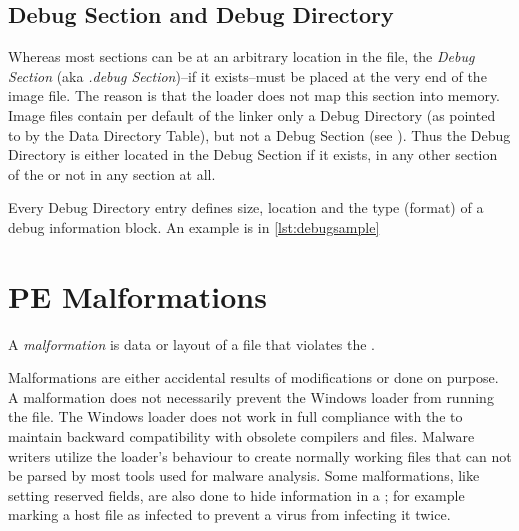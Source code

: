 \subsection*{Debug Section and Debug Directory}

Whereas most sections can be at an arbitrary location in the file, the \emph{Debug Section} (aka \emph{.debug Section})--if it exists--must be placed at the very end of the image file. The reason is that the loader does not map this section into memory. Image files contain per default of the linker only a Debug Directory (as pointed to by the Data Directory Table), but not a Debug Section (see \cite[]{pespec}). Thus the Debug Directory is either located in the Debug Section if it exists, in any other section of the \PE{} or not in any section at all.

Every Debug Directory entry defines \ia{} size, location and the type (format) of a debug information block. An example is in \autoref{lst:debugsample}




\section{PE Malformations} \label{sec:malformations}

\begin{definition}[Malformation]
A \emph{malformation} is data or layout of a \PE{} file that violates the \PECOFF{}.
\end{definition} 

Malformations are either accidental results of \PE{} modifications or done on purpose.
A malformation does not necessarily prevent the Windows loader from running the file. The Windows loader does not work in full compliance with the \PECOFF{} to maintain backward compatibility with obsolete compilers and files. Malware writers utilize the loader's behaviour to create normally working \PE{} files that can not be parsed by most tools used for malware analysis. Some malformations, like setting reserved fields, are also done to hide information in a \PE{}; for example marking a host file as infected to prevent a virus from infecting it twice.

